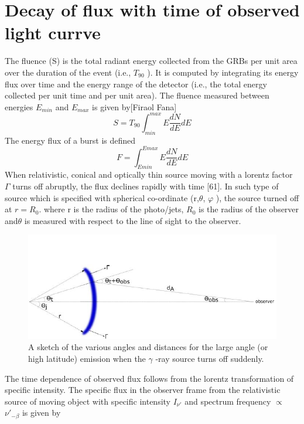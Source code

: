\section{Decay of flux with time of observed light currve }
The fluence (S) is the total radiant energy collected from the GRBs per unit area over the duration of the event (i.e., $ T_{90} $ ). It is computed by integrating its energy flux over time and the energy range of the detector (i.e., the total energy collected per unit time and per unit area). The fluence measured between energies $ E_{min} $ and $ E_{max} $ is given by[Firaol Fana]
\begin{equation}
S= T_{90}\int_{min}^{max}E\frac{dN}{dE}dE
\end{equation}
The energy flux of a burst is defined
\begin{equation}
F=\int_{Emin}^{Emax}E\frac{dN}{dE}dE
\end{equation}
When relativistic, conical and optically thin source moving with a lorentz factor     $ \Gamma $ turns off abruptly, the flux declines rapidly with time [61]. In such type of source which is specified with spherical co-ordinate (r,$\theta $, $\varphi $ ), the source turned off at $ r =  R_{0} $. where r is the radius of the photo/jets, $ R_{0} $ is the radius of the observer and$ \theta $ is measured with respect to the line of sight to the observer.
\begin{figure}[h]
\begin{center}
\includegraphics[scale=0.5]{Figures/Flux.png}
\caption{ A sketch of the various angles and distances for the large angle (or high
latitude) emission when the $\gamma$ -ray source turns off suddenly.}
\end{center}
\end{figure}
The time dependence of observed flux follows from the lorentz transformation of
specific intensity. The specific flux in the observer frame from the relativistic source of moving object with specific intensity $ I_{\nu'} $ and spectrum frequency $\propto $ $ \nu'_{-\beta} $ is given by
